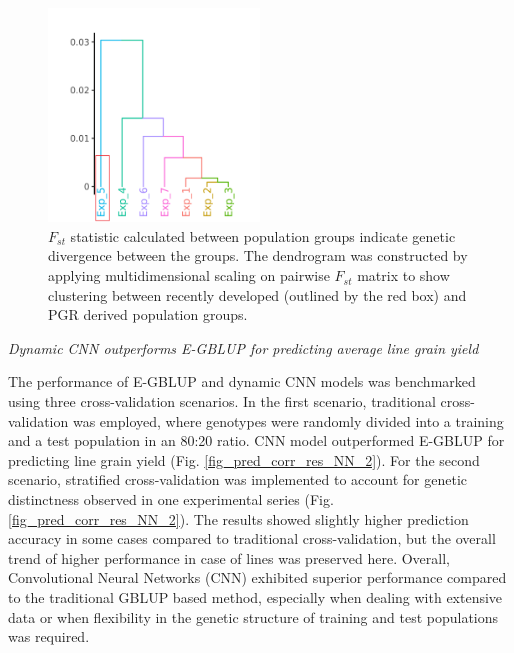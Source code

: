 \documentclass[english, biblatex]{lni}
\begin{document}
\begin{figure}[h]
    \centering
    \includegraphics[width=0.5\textwidth]{fst_plot}
    \caption{$F_{st}$ statistic calculated between population groups indicate genetic divergence between the groups. The dendrogram was constructed by applying multidimensional scaling on pairwise $F_{st}$ matrix to show clustering between recently developed (outlined by the red box) and PGR derived population groups.}
    \label{fig_fst_plot}
\end{figure}

\textit{Dynamic CNN outperforms E-GBLUP for predicting average line grain yield} 

The performance of E-GBLUP and dynamic CNN models was benchmarked using three cross-validation scenarios. In the first scenario, traditional cross-validation was employed, where genotypes were randomly divided into a training and a test population in an 80:20 ratio. CNN model outperformed E-GBLUP for predicting line grain yield (Fig. \ref{fig_pred_corr_res_NN_2}). For the second scenario, stratified cross-validation was implemented to account for genetic distinctness observed in one experimental series (Fig. \ref{fig_pred_corr_res_NN_2}). The results showed slightly higher prediction accuracy in some cases compared to traditional cross-validation, but the overall trend of higher performance in case of lines was preserved here. Overall, Convolutional Neural Networks (CNN) exhibited superior performance compared to the traditional GBLUP based method, especially when dealing with extensive data or when flexibility in the genetic structure of training and test populations was required.
\end{document}
